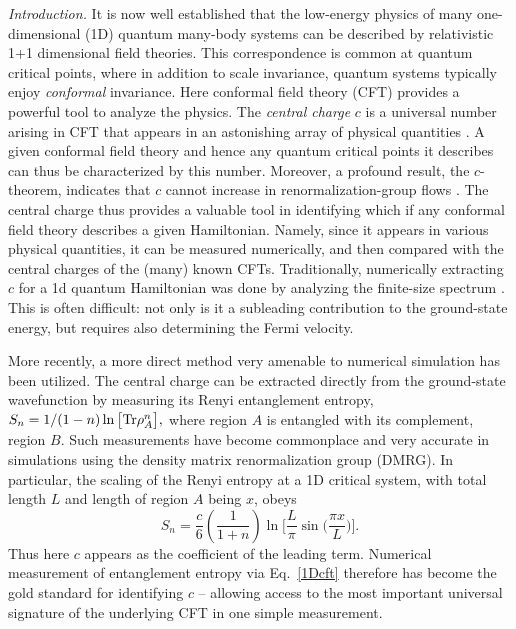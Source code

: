 \documentclass[prl,aps,twocolumn,floatfix,amsmath,amssymb,superscriptaddress,tightenlines]{revtex4}
\begin{document}
{\it Introduction.} It is now well established that the low-energy
physics of many one-dimensional (1D) quantum many-body systems can be
described by relativistic 1+1 dimensional field theories.  This
correspondence is common at quantum critical points, where in addition
to scale invariance, quantum systems typically enjoy {\it conformal}
invariance. Here conformal field theory (CFT) provides a powerful tool
to analyze the physics. The {\it central charge} $c$ is a universal
number arising in CFT that appears in an astonishing array of physical
quantities \cite{Cardyubiquitous}. A given conformal field theory and
hence any quantum critical points it describes can thus be
characterized by this number. Moreover, a profound result, the
$c$-theorem, indicates that $c$ cannot increase in
renormalization-group flows \cite{Zamo}. The central charge thus
provides a valuable tool in identifying which if any conformal field
theory describes a given Hamiltonian. Namely, since it appears in
various physical quantities, it can be measured numerically, and then
compared with the central charges of the (many) known
CFTs. Traditionally, numerically extracting $c$ for a 1d quantum
Hamiltonian was done by analyzing the finite-size spectrum
\cite{BCN,Affleck}.  This is often difficult: not only is it a
subleading contribution to the ground-state energy, but requires also
determining the Fermi velocity.

More recently, a more direct method very amenable to numerical
simulation has been utilized.  The central charge can be extracted
directly from the ground-state wavefunction by measuring its Renyi
entanglement entropy, $ S_n = 1/(1-n) \ln \big[ {\rm Tr} \rho_A^n
\big], $ where region $A$ is entangled with its complement, region
$B$. Such measurements have become commonplace and very accurate in
simulations using the density matrix renormalization group (DMRG).  In
particular, the scaling of the Renyi entropy at a 1D critical system,
with total length $L$ and length of region $A$ being $x$, obeys
\begin{equation}
S_n = \frac{c}{6}\left({ \frac{1}{1+n} }\right) \ln\Big[ \frac{L}{\pi} \sin\big( \frac{\pi x}{L} \big) \Big]. \label{1Dcft}
\end{equation}
Thus here $c$ appears as the coefficient of the leading
term.  Numerical measurement of entanglement entropy via
Eq.~\ref{1Dcft} therefore has become the gold standard for identifying
$c$ -- allowing access to the most important universal signature of
the underlying CFT in one simple measurement.
\end{document}
